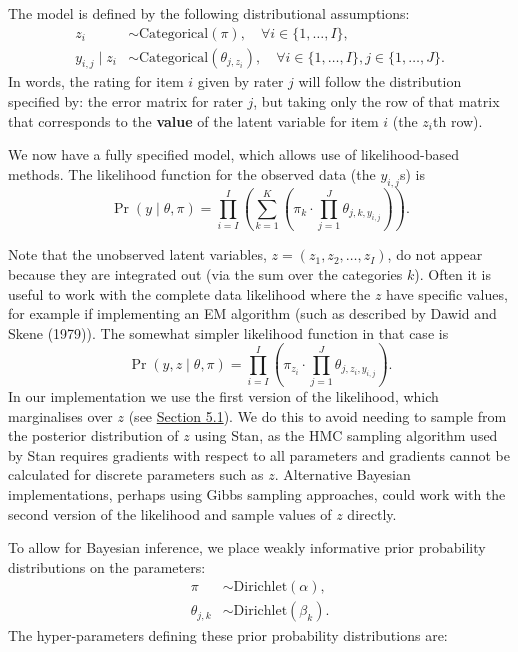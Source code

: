 The model is defined by the following distributional assumptions:
\[
\begin{aligned}
z_i &\sim
   \textrm{Categorical}(\pi),
   \quad \forall i \in \{1, \dots, I\}, \\
y_{i, j} \mid z_i &\sim
   \textrm{Categorical}(\theta_{j, z_i}),
   \quad \forall i \in \{1, \dots, I\},
   j \in \{1, \dots, J\}.
\end{aligned}
\]
In words, the rating for item \(i\) given by rater \(j\) will follow the
distribution specified by: the error matrix for rater \(j\), but taking
only the row of that matrix that corresponds to the \textbf{value} of the
latent variable for item \(i\) (the \(z_i\)th row).

We now have a fully specified model, which allows use of
likelihood-based methods. The likelihood function for the observed data
(the \(y_{i,j}\)s) is
\[
  \Pr(y \mid \theta, \pi) =
  \prod_{i = I}^{I} \left(\sum_{k = 1}^{K}
  \left(\pi_{k} \cdot \prod_{j = 1}^{J} \theta_{j, k, y_{i,j}}\right)\right).
  \label{eq:eqnmarginalise}
\]

Note that the unobserved latent variables,
\(z = ({z}_{1}, {z}_{2}, \ldots, {z}_{I})\), do not appear because they
are integrated out (via the sum over the categories \(k\)). Often it is
useful to work with the complete data likelihood where the \(z\) have
specific values, for example if implementing an EM algorithm (such as
described by Dawid and Skene (1979)). The somewhat simpler likelihood function in
that case is
\[
  \Pr(y, z \mid \theta, \pi) =
  \prod_{i = I}^{I} \left(\pi_{z_{i}} \cdot
  \prod_{j = 1}^{J} \theta_{j, z_{i}, y_{i,j}}\right).
\]
In our implementation we use the first version of the likelihood, which
marginalises over \(z\) (see \protect\hyperlink{sec:marginalisation}{Section 5.1}). We do this to avoid
needing to sample from the posterior distribution of \(z\) using Stan,
as the HMC sampling algorithm used by Stan requires gradients with respect to
all parameters and gradients cannot be calculated for discrete
parameters such as \(z\). Alternative Bayesian implementations, perhaps using
Gibbs sampling approaches, could work with the second version of the likelihood
and sample values of \(z\) directly.

To allow for Bayesian inference, we place weakly informative prior
probability distributions on the parameters:
\[
\begin{aligned}
\pi            &\sim \textrm{Dirichlet}(\alpha), \\
\theta_{j, k}  &\sim \textrm{Dirichlet}(\beta_k).
\end{aligned}
\]
The hyper-parameters defining these prior probability distributions are:

